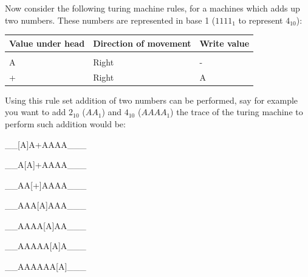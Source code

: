 \documentclass[a4paper,10pt]{article}
\theoremstyle{mytheor}
\begin{document}
{    Now consider the following turing machine rules, for a machines
    which adds up two numbers. These numbers are represented in base 1
    ($1111_1$ to represent $4_{10}$):
    \begin{table}
      \centering
      \renewcommand{\arraystretch}{1.1}
      \begin{tabularx}{0.8\textwidth}{|X|X|X|}
        \hline
        \rowcolor{greatblue}
        \color{white} Value under head & \color{white}Direction of movement & \color{white}Write value \\
        \hline
        \vspace{0.2cm}&&\\
        A & Right & - \\
        + & Right & A \\
        \hline
      \end{tabularx}
    \end{table}

    Using this rule set addition of two numbers can be performed, say
    for example you want to add $2_{10}$ ($AA_1$) and $4_{10}$ ($AAAA_1$) the trace of the turing
    machine to perform such addition would be:
    \begin{legal}
    \item \begin{textsc}\_\_[A]A+AAAA\_\_\_\end{textsc}
    \item \begin{textsc}\_\_A[A]+AAAA\_\_\_\end{textsc}
    \item \begin{textsc}\_\_AA[+]AAAA\_\_\_\end{textsc}
    \item \begin{textsc}\_\_AAA[A]AAA\_\_\_\end{textsc}
    \item \begin{textsc}\_\_AAAA[A]AA\_\_\_\end{textsc}
    \item \begin{textsc}\_\_AAAAA[A]A\_\_\_\end{textsc}
    \item \begin{textsc}\_\_AAAAAA[A]\_\_\_\end{textsc}
      

\end{legal}}
\end{document}
